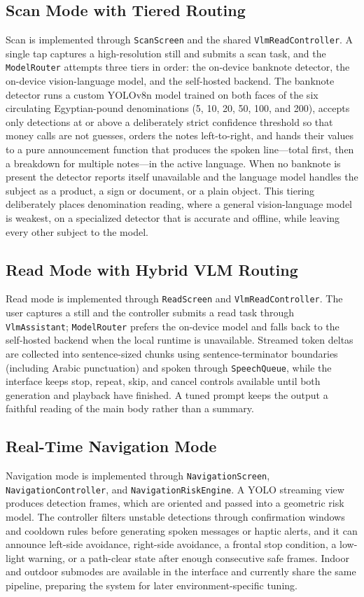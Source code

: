 \documentclass[12pt,a4paper]{report}
\begin{document}
\subsection{Scan Mode with Tiered Routing}
Scan is implemented through \texttt{ScanScreen} and the shared \texttt{VlmReadController}. A single tap captures a high-resolution still and submits a scan task, and the \texttt{ModelRouter} attempts three tiers in order: the on-device banknote detector, the on-device vision-language model, and the self-hosted backend. The banknote detector runs a custom YOLOv8n model trained on both faces of the six circulating Egyptian-pound denominations (5, 10, 20, 50, 100, and 200), accepts only detections at or above a deliberately strict confidence threshold so that money calls are not guesses, orders the notes left-to-right, and hands their values to a pure announcement function that produces the spoken line---total first, then a breakdown for multiple notes---in the active language. When no banknote is present the detector reports itself unavailable and the language model handles the subject as a product, a sign or document, or a plain object. This tiering deliberately places denomination reading, where a general vision-language model is weakest, on a specialized detector that is accurate and offline, while leaving every other subject to the model.

\subsection{Read Mode with Hybrid VLM Routing}
Read mode is implemented through \texttt{ReadScreen} and \texttt{VlmReadController}. The user captures a still and the controller submits a read task through \texttt{VlmAssistant}; \texttt{ModelRouter} prefers the on-device model and falls back to the self-hosted backend when the local runtime is unavailable. Streamed token deltas are collected into sentence-sized chunks using sentence-terminator boundaries (including Arabic punctuation) and spoken through \texttt{SpeechQueue}, while the interface keeps stop, repeat, skip, and cancel controls available until both generation and playback have finished. A tuned prompt keeps the output a faithful reading of the main body rather than a summary.

\subsection{Real-Time Navigation Mode}
Navigation mode is implemented through \texttt{NavigationScreen}, \texttt{NavigationController}, and \texttt{NavigationRiskEngine}. A YOLO streaming view produces detection frames, which are oriented and passed into a geometric risk model. The controller filters unstable detections through confirmation windows and cooldown rules before generating spoken messages or haptic alerts, and it can announce left-side avoidance, right-side avoidance, a frontal stop condition, a low-light warning, or a path-clear state after enough consecutive safe frames. Indoor and outdoor submodes are available in the interface and currently share the same pipeline, preparing the system for later environment-specific tuning.
\end{document}
